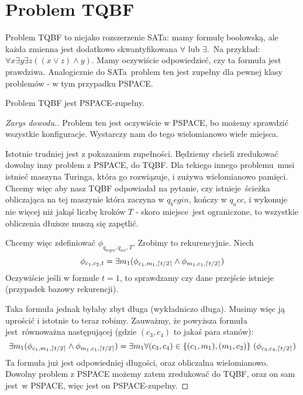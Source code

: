 \section{Problem TQBF}

Problem TQBF to niejako rozszerzenie SATa: mamy formułę boolowską, ale każda zmienna jest dodatkowo skwantyfikowana \(\forall\) lub \(\exists\).\
Na przykład: \(\forall x \exists y \exists z ((x \vee z) \wedge y)\). Mamy oczywiście odpowiedzieć, czy ta formuła jest prawdziwa. Analogicznie do SATa\
problem ten jest zupełny dla pewnej klasy problemów - w tym przypadku PSPACE.

\begin{theorem}
	Problem TQBF jest PSPACE-zupełny.
\end{theorem}

\begin{proof}[Zarys dowodu.]
	Problem ten jest oczywiście w PSPACE, bo możemy sprawdzić wszystkie konfiguracje. Wystarczy nam do tego wielomianowo wiele miejsca.

	Istotnie trudniej jest z pokazaniem zupełności. Będziemy chcieli zredukować dowolny inny problem z PSPACE, do TQBF. Dla tekiego innego problemu\
	musi istnieć maszyna Turinga, która go rozwiązuje, i zużywa wielomianowo pamięci. Chcemy więc aby nasz TQBF odpowiadał na pytanie, czy istnieje\
	ścieżka obliczająca na tej maszynie która zaczyna w \(q_begin\), kończy w \(q_acc\), i wykonuje nie więcej niż jakąś liczbę kroków \(T\) - skoro miejsce\
	jest ograniczone, to wszystkie obliczenia dłuższe muszą się zapętlić.

	Chcemy więc zdefiniować \(\phi_{q_{begin},q_{acc},T}\). Zrobimy to rekurencyjnie. Niech
	\[
		\phi_{c_1,c_2,t} = \exists m_1 (\phi_{c_1, m_1, \left\lceil t/2\right\rceil} \wedge \phi_{m_1, c_1, \left\lceil t/2\right\rceil})
	\]
	Oczywiście jeśli w formule \(t=1\), to sprawdzamy czy dane przejście istnieje (przypadek bazowy rekurencji).

	Taka formuła jednak byłaby zbyt długa (wykładniczo długa). Musimy więc ją uprościć i istotnie to teraz robimy. Zauważmy, że powyższa formuła jest\
	równoważna następującej (gdzie \((c_3, c_4)\) to jakaś para stanów):
	\[
		\exists m_1 (\phi_{c_1, m_1, \left\lceil t/2\right\rceil} \wedge \phi_{m_1, c_1, \left\lceil t/2\right\rceil}) = \exists m_1 \forall(c_3, c_4) \in \{(c_1,m_1),(m_1,c_2)\}\
		(\phi_{c_3,c_4,\left\lceil t/2\right\rceil})
	\]
	Ta formuła już jest odpowiedniej długości, oraz obliczalna wielomianowo. Dowolny problem z PSPACE możemy zatem zredukować do TQBF, oraz on sam jest\
	w PSPACE, więc jest on PSPACE-zupełny.
\end{proof}